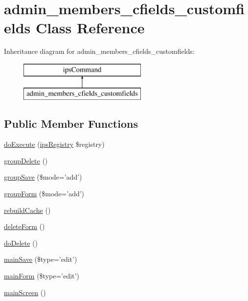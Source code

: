 \hypertarget{classadmin__members__cfields__customfields}{\section{admin\-\_\-members\-\_\-cfields\-\_\-customfields Class Reference}
\label{classadmin__members__cfields__customfields}
}
Inheritance diagram for admin\-\_\-members\-\_\-cfields\-\_\-customfields\-:\begin{figure}[H]
\begin{center}
\leavevmode
\includegraphics[height=2.000000cm]{classadmin__members__cfields__customfields}
\end{center}
\end{figure}
\subsection*{Public Member Functions}
\begin{DoxyCompactItemize}
\item 
\hyperlink{classadmin__members__cfields__customfields_afbc4e912a0604b94d47d66744c64d8ba}{do\-Execute} (\hyperlink{classips_registry}{ips\-Registry} \$registry)
\item 
\hyperlink{classadmin__members__cfields__customfields_a2a73b6777d2430428f47d05ccfc612c1}{group\-Delete} ()
\item 
\hyperlink{classadmin__members__cfields__customfields_a0c087fe1f388cc8090277778b9bc73e4}{group\-Save} (\$mode='add')
\item 
\hyperlink{classadmin__members__cfields__customfields_a29662786489931b285c710264c34c8bd}{group\-Form} (\$mode='add')
\item 
\hyperlink{classadmin__members__cfields__customfields_acca9b08c34cf38662a27c568d5a380f0}{rebuild\-Cache} ()
\item 
\hyperlink{classadmin__members__cfields__customfields_aa3b41ed1db7da38d381bc5aa243052dd}{delete\-Form} ()
\item 
\hyperlink{classadmin__members__cfields__customfields_a456f0999a393f02f9f18aecfbc6955aa}{do\-Delete} ()
\item 
\hyperlink{classadmin__members__cfields__customfields_a432961b39d7b970b1278cb9478e75dfd}{main\-Save} (\$type='edit')
\item 
\hyperlink{classadmin__members__cfields__customfields_a69cb44bf7f75f32e550a0beac6154b8e}{main\-Form} (\$type='edit')
\item 
\hyperlink{classadmin__members__cfields__customfields_a085ef83a45dfe4ffce64778747ce550a}{main\-Screen} ()
\end{DoxyCompactItemize}
